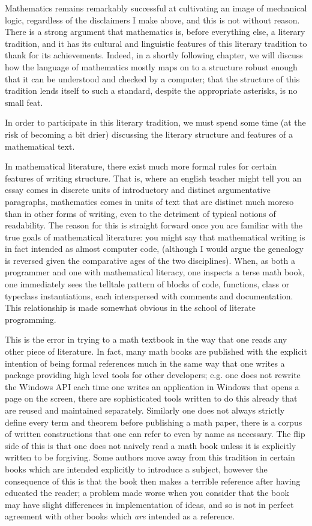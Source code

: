 \documentclass[11pt]{article}
\begin{document}
Mathematics remains remarkably successful at cultivating an image of mechanical logic, regardless of the disclaimers I make above, and this is not without reason. There is a strong argument that mathematics is, before everything else, a literary tradition, and it has its cultural and linguistic features of this literary tradition to thank for its achievements. Indeed, in a shortly following chapter, we will discuss how the language of mathematics mostly maps on to a structure robust enough that it can be understood and checked by a computer; that the structure of this tradition lends itself to such a standard, despite the appropriate asterisks, is no small feat.

In order to participate in this literary tradition, we must spend some time (at the risk of becoming a bit drier) discussing the literary structure and features of a mathematical text.

In mathematical literature, there exist much more formal rules for certain features of writing structure. That is, where an english teacher might tell you an essay comes in discrete units of introductory and distinct argumentative paragraphs, mathematics comes in units of text that are distinct much moreso than in other forms of writing, even to the detriment of typical notions of readability. The reason for this is straight forward once you are familiar with the true goals of mathematical literature: you might say that mathematical writing is in fact intended as almost computer code, (although I would argue the genealogy is reversed given the comparative ages of the two disciplines). When, as both a programmer and one with mathematical literacy, one inspects a terse math book, one immediately sees the telltale pattern of blocks of code, functions, class or typeclass instantiations, each interspersed with comments and documentation. This relationship is made somewhat obvious in the school of literate programming.

This is the error in trying to  a math textbook in the way that one reads any other piece of literature. In fact, many math books are published with the explicit intention of being formal references much in the same way that one writes a package providing high level tools for other developers; e.g. one does not rewrite the Windows API each time one writes an application in Windows that opens a page on the screen, there are sophisticated tools written to do this already that are reused and maintained separately. Similarly one does not always strictly define every term and theorem before publishing a math paper, there is a corpus of written constructions that one can refer to even by name as necessary. The flip side of this is that one does not naively read a math book unless it is explicitly written to be forgiving. Some authors move away from this tradition in certain books which are intended explicitly to introduce a subject, however the consequence of this is that the book then makes a terrible reference after having educated the reader; a problem made worse when you consider that the book may have slight differences in implementation of ideas, and so is not in perfect agreement with other books which \emph{are} intended as a reference.
\end{document}
